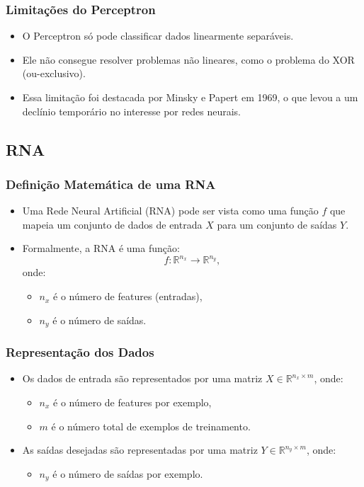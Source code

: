 \documentclass[aspectratio=169]{beamer}
\begin{document}
\begin{frame}
\frametitle{Limitações do Perceptron}
\begin{itemize}
    \item O Perceptron só pode classificar dados linearmente separáveis.
    \item Ele não consegue resolver problemas não lineares, como o problema do XOR (ou-exclusivo).
    \item Essa limitação foi destacada por Minsky e Papert em 1969, o que levou a um declínio temporário no interesse por redes neurais.
\end{itemize}
\end{frame}
\subsection{RNA}
\begin{frame}
\frametitle{Definição Matemática de uma RNA}
\begin{itemize}
    \item Uma Rede Neural Artificial (RNA) pode ser vista como uma função \( f \) que mapeia um conjunto de dados de entrada \( X \) para um conjunto de saídas \( Y \).
    \item Formalmente, a RNA é uma função:
    \[
    f: \mathbb{R}^{n_x} \to \mathbb{R}^{n_y},
    \]
    onde:
    \begin{itemize}
        \item \( n_x \) é o número de features (entradas),
        \item \( n_y \) é o número de saídas.
    \end{itemize}
\end{itemize}
\end{frame}

\begin{frame}
\frametitle{Representação dos Dados}
\begin{itemize}
    \item Os dados de entrada são representados por uma matriz \( X \in \mathbb{R}^{n_x \times m} \), onde:
    \begin{itemize}
        \item \( n_x \) é o número de features por exemplo,
        \item \( m \) é o número total de exemplos de treinamento.
    \end{itemize}
    \item As saídas desejadas são representadas por uma matriz \( Y \in \mathbb{R}^{n_y \times m} \), onde:
    \begin{itemize}
        \item \( n_y \) é o número de saídas por exemplo.
    \end{itemize}
\end{itemize}
\end{frame}
\end{document}
